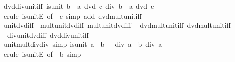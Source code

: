 \begin{isabellebody}
\endisatagproof
{\isafoldproof}%
%
\isadelimproof
\isanewline
%
\endisadelimproof
\isanewline
{}\isamarkupfalse%
\ dvd{\isacharunderscore}{\kern0pt}div{\isacharunderscore}{\kern0pt}unit{\isacharunderscore}{\kern0pt}iff{\isacharcolon}{\kern0pt}\ {\isachardoublequoteopen}is{\isacharunderscore}{\kern0pt}unit\ b\ {\isasymLongrightarrow}\ a\ dvd\ c\ div\ b\ {\isasymlongleftrightarrow}\ a\ dvd\ c{\isachardoublequoteclose}\isanewline
%
\isadelimproof
\ \ %
\endisadelimproof
%
\isatagproof
{}\isamarkupfalse%
\ {\isacharparenleft}{\kern0pt}erule\ is{\isacharunderscore}{\kern0pt}unitE\ {\isacharbrackleft}{\kern0pt}of\ {\isacharunderscore}{\kern0pt}\ c{\isacharbrackright}{\kern0pt}{\isacharparenright}{\kern0pt}\ {\isacharparenleft}{\kern0pt}simp\ add{\isacharcolon}{\kern0pt}\ dvd{\isacharunderscore}{\kern0pt}mult{\isacharunderscore}{\kern0pt}unit{\isacharunderscore}{\kern0pt}iff{\isacharparenright}{\kern0pt}%
\endisatagproof
{\isafoldproof}%
%
\isadelimproof
\isanewline
%
\endisadelimproof
\isanewline
{}\isamarkupfalse%
\ unit{\isacharunderscore}{\kern0pt}dvd{\isacharunderscore}{\kern0pt}iff\ {\isacharequal}{\kern0pt}\ mult{\isacharunderscore}{\kern0pt}unit{\isacharunderscore}{\kern0pt}dvd{\isacharunderscore}{\kern0pt}iff\ mult{\isacharunderscore}{\kern0pt}unit{\isacharunderscore}{\kern0pt}dvd{\isacharunderscore}{\kern0pt}iff{\isacharprime}{\kern0pt}\isanewline
\ \ dvd{\isacharunderscore}{\kern0pt}mult{\isacharunderscore}{\kern0pt}unit{\isacharunderscore}{\kern0pt}iff\ dvd{\isacharunderscore}{\kern0pt}mult{\isacharunderscore}{\kern0pt}unit{\isacharunderscore}{\kern0pt}iff{\isacharprime}{\kern0pt}\ \isanewline
\ \ div{\isacharunderscore}{\kern0pt}unit{\isacharunderscore}{\kern0pt}dvd{\isacharunderscore}{\kern0pt}iff\ dvd{\isacharunderscore}{\kern0pt}div{\isacharunderscore}{\kern0pt}unit{\isacharunderscore}{\kern0pt}iff\ \isanewline
\isanewline
{}\isamarkupfalse%
\ unit{\isacharunderscore}{\kern0pt}mult{\isacharunderscore}{\kern0pt}div{\isacharunderscore}{\kern0pt}div\ {\isacharbrackleft}{\kern0pt}simp{\isacharbrackright}{\kern0pt}{\isacharcolon}{\kern0pt}\ {\isachardoublequoteopen}is{\isacharunderscore}{\kern0pt}unit\ a\ {\isasymLongrightarrow}\ b\ {\isacharasterisk}{\kern0pt}\ {\isacharparenleft}{\kern0pt}{}\ div\ a{\isacharparenright}{\kern0pt}\ {\isacharequal}{\kern0pt}\ b\ div\ a{\isachardoublequoteclose}\isanewline
%
\isadelimproof
\ \ %
\endisadelimproof
%
\isatagproof
{}\isamarkupfalse%
\ {\isacharparenleft}{\kern0pt}erule\ is{\isacharunderscore}{\kern0pt}unitE\ {\isacharbrackleft}{\kern0pt}of\ {\isacharunderscore}{\kern0pt}\ b{\isacharbrackright}{\kern0pt}{\isacharparenright}{\kern0pt}\ simp%

\end{isabellebody}
